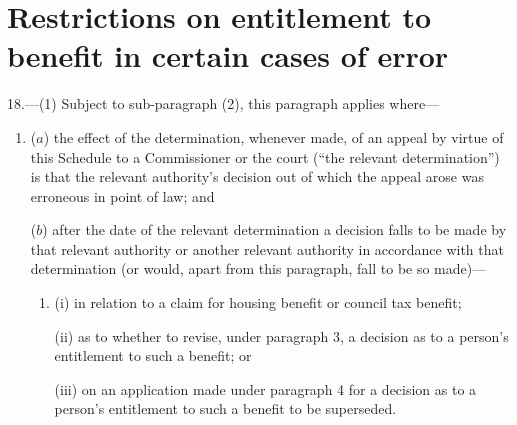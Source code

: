 \documentclass[12pt,a4paper]{article}
\begin{document}
%
%
%
%
%
%
%
%
%
%


\section*{Restrictions on entitlement to benefit in certain cases of error}

18.---(1) Subject to sub-paragraph (2), this paragraph applies where—
\begin{enumerate}\item[]
($a$) the effect of the determination, whenever made, of an appeal by virtue of this Schedule to a Commissioner or the court (“the relevant determination”) is that the relevant authority’s decision out of which the appeal arose was erroneous in point of law; and

($b$) after the date of the relevant determination a decision falls to be made by that relevant authority or another relevant authority in accordance with that determination (or would, apart from this paragraph, fall to be so made)—
\begin{enumerate}\item[]
(i) in relation to a claim for housing benefit or council tax benefit;

(ii) as to whether to revise, under paragraph 3, a decision as to a person’s entitlement to such a benefit; or

(iii) on an application made under paragraph 4 for a decision as to a person’s entitlement to such a benefit to be superseded.
\end{enumerate}
\end{enumerate}
\end{document}
